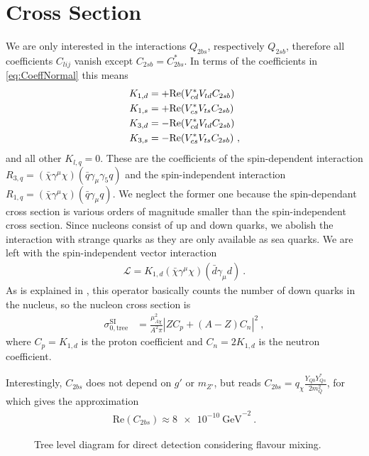 \section{Cross Section}
We are only interested in the interactions $Q_{2bs}$, respectively $Q_{2sb}$, therefore all coefficients $C_{lij}$ vanish except $C_{2sb} = C_{2bs}^*$. In terms of the coefficients in \eqref{eq:CoeffNormal} this means
\begin{align}
	K_{1,d} &= +\text{Re}(V_{cd}^*V_{td}C_{2sb})\notag \\
	K_{1,s} &= +\text{Re}(V_{cs}^*V_{ts}C_{2sb})\notag \\
	K_{3,d} &= -\text{Re}(V_{cd}^*V_{td}C_{2sb})\notag \\
	K_{3,s} &= -\text{Re}(V_{cs}^*V_{ts}C_{2sb}) \ ,
\end{align}
and all other $K_{l,q}=0$. These are the coefficients of the spin-dependent interaction $R_{3,q} = (\bar{\chi}\gamma^\mu\chi)(\bar{q}\gamma_\mu\gamma_5 q)$ and the spin-independent interaction $R_{1,q} = (\bar{\chi}\gamma^\mu\chi)(\bar{q}\gamma_\mu q)$. We neglect the former one because the spin-dependant cross section is various orders of magnitude smaller than the spin-independent cross section. Since nucleons consist of up and down quarks, we abolish the interaction with strange quarks as they are only available as sea quarks. We are left with the spin-independent vector interaction
\begin{align}
	\mathcal{L} = K_{1,d}(\bar{\chi}\gamma^\mu\chi)(\bar{d}\gamma_\mu d) \ .
\end{align}
As is explained in \cite[Chapter 7]{Supersymmetric}, this operator basically counts the number of down quarks in the nucleus, so the nucleon cross section is
\begin{align}
	\sigma_{0,\text{tree}}^\text{SI} &= \frac{\mu_{A\chi}^2}{A^2\pi}\left|ZC_p +(A-Z)C_n\right|^2 \ ,
\end{align}
where $C_p = K_{1,d}$ is the proton coefficient and $C_n = 2K_{1,d}$ is the neutron coefficient.


Interestingly, $C_{2bs}$ does not depend on $g'$ or $m_{Z'}$, but reads $C_{2bs} = q_\chi\frac{Y_{Qb}Y_{Qs}^*}{2m_Q^2}$, for which \cite{InColour} gives the approximation
\begin{align}\label{eq:BoundC}
	\text{Re}\left(C_{2bs}\right) \approx \SI{8e-10}{\giga\electronvolt}^{-2} \ .
\end{align}
\begin{figure}
	\centering
	
	\caption{Tree level diagram for direct detection considering flavour mixing.}
	\label{fig:DD}
\end{figure}


